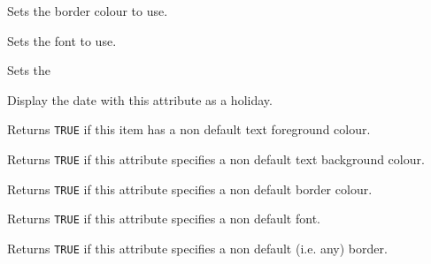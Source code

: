 
Sets the border colour to use.

\label{wxcalendardateattrsetfont}


Sets the font to use.

\label{wxcalendardateattrsetborder}


Sets the 

\label{wxcalendardateattrsetholiday}


Display the date with this attribute as a holiday.

\label{wxcalendardateattrhastextcolour}


Returns {\tt TRUE} if this item has a non default text foreground colour.

\label{wxcalendardateattrhasbackgroundcolour}


Returns {\tt TRUE} if this attribute specifies a non default text background colour.

\label{wxcalendardateattrhasbordercolour}


Returns {\tt TRUE} if this attribute specifies a non default border colour.

\label{wxcalendardateattrhasfont}


Returns {\tt TRUE} if this attribute specifies a non default font.

\label{wxcalendardateattrhasborder}


Returns {\tt TRUE} if this attribute specifies a non default (i.e. any) border.

